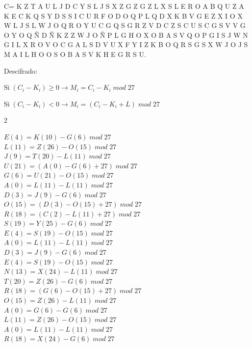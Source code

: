 \documentclass{article}
\begin{document}
\begin{enumerate}
    C= K Z T A U L J D C Y S L J S X Z G Z G Z L X S L E R O A B Q U Z A K E C K Q S Y D S S I C U R F O D O Q P L Q D X K B V G E Z X I O X W L J S L W J O Q R O Y U C G Q S G R Z V D C Z S C U S C G S V V G O Y O Q Ñ D Ñ K Z Z W J O Ñ P L G H O X O B A S V Q O P G I S J W N G I L X R O V O C G A L S D V U X F Y I Z K B O Q R S G S X W J O J S M A I L H O O S O B A S V K H E G R S U.


Descifrado:

$ \text{Si} \; (C_{i}- K_{i}) \ge 0 \rightarrow  M_{i} = C_{i} - K_{i} \;  mod \; 27$

$ \text{Si} \; (C_{i}- K_{i}) < 0 \rightarrow  M_{i} = (C_{i} - K_{i} + L ) \;  mod \; 27$ 

\begin{multicols}{2}

$E (4) = K (10) - G (6)\;  mod \; 27$ \\
$L (11) = Z (26) - O (15)\;  mod \; 27$\\
$J (9) = T (20) - L (11)\;  mod \; 27$ \\
$U (21) = (A (0) - G (6) + 27)\;  mod \; 27$\\
$G (6) = U (21) - O (15)\;  mod \; 27$\\
$A (0) = L (11) - L (11)\;  mod \; 27$\\
$D (3) = J (9) - G (6) \;  mod \; 27$\\
$O (15) =  (D(3) - O (15) + 27)\;  mod \; 27$\\
$R (18) = (C(2) - L (11) + 27)\;  mod \; 27$\\
$S (19) = Y (25) - G (6) \;  mod \; 27$\\
$E (4) = S (19) - O (15)\;  mod \; 27$\\
$A (0) = L (11) - L (11)\;  mod \; 27$\\
$D (3) = J (9) - G (6) \;  mod \; 27$\\
$E (4) = S (19) - O (15)\;  mod \; 27$\\
$N (13) = X (24) - L (11)\;  mod \; 27$\\
$T (20) = Z (26) - G (6) \;  mod \; 27$\\
$R (18) = (G (6) - O (15) + 27)\;  mod \; 27$\\
$O (15) = Z (26) - L (11)\;  mod \; 27$\\
$A (0) = G (6) - G (6) \;  mod \; 27$\\
$L (11) = Z (26) - O (15) \;  mod \; 27$\\
$A (0) = L (11) - L (11)\;  mod \; 27$\\
$R (18) = X (24) - G (6) \;  mod \; 27$\\

\end{multicols}
\end{enumerate}
\end{document}
